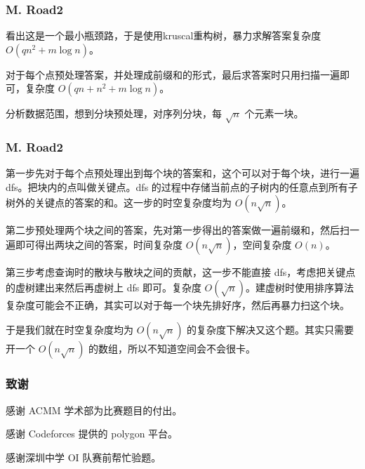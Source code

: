 \documentclass[10pt,aspectratio=169,mathserif]{beamer}
\renewcommand*{\songti}{\CJKfamily{zhsong}}
\begin{document}
    \begin{frame}
        \frametitle{\songti \bfseries M. Road2}
        
看出这是一个最小瓶颈路，于是使用kruscal重构树，暴力求解答案复杂度 $O(qn^2+m\log n)$。

对于每个点预处理答案，并处理成前缀和的形式，最后求答案时只用扫描一遍即可，复杂度 $O(qn+n^2+m\log n)$。

分析数据范围，想到分块预处理，对序列分块，每 $\sqrt{n}$ 个元素一块。
    \end{frame}

        \begin{frame}
        \frametitle{\songti \bfseries M. Road2}
        
第一步先对于每个点预处理出到每个块的答案和，这个可以对于每个块，进行一遍 dfs。把块内的点叫做关键点。dfs 的过程中存储当前点的子树内的任意点到所有子树外的关键点的答案的和。这一步的时空复杂度均为 $O(n\sqrt n)$。

第二步预处理两个块之间的答案，先对第一步得出的答案做一遍前缀和，然后扫一遍即可得出两块之间的答案，时间复杂度 $O(n\sqrt n)$，空间复杂度 $O(n)$。

第三步考虑查询时的散块与散块之间的贡献，这一步不能直接 dfs，考虑把关键点的虚树建出来然后再虚树上 dfs 即可。复杂度 $O(\sqrt{n})$。建虚树时使用排序算法复杂度可能会不正确，其实可以对于每一个块先排好序，然后再暴力扫这个块。 

于是我们就在时空复杂度均为 $O(n\sqrt n)$ 的复杂度下解决又这个题。其实只需要开一个 $O(n\sqrt{n})$ 的数组，所以不知道空间会不会很卡。
    \end{frame}

    \begin{frame}
        \frametitle{致谢}
        感谢 ACMM 学术部为比赛题目的付出。

        感谢 Codeforces 提供的 polygon 平台。

        感谢深圳中学 OI 队赛前帮忙验题。
    \end{frame}
\end{document}
